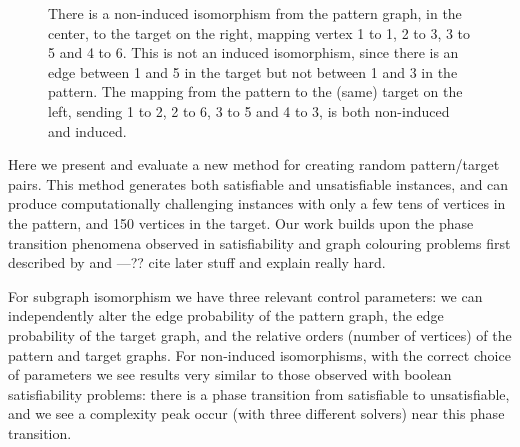 \documentclass[letterpaper]{article}
\begin{document}
\begin{figure}[b]

    \caption{There is a non-induced isomorphism from the pattern graph, in the center, to the target
    on the right, mapping vertex 1 to 1, 2 to 3, 3 to 5 and 4 to 6. This is not an induced
    isomorphism, since there is an edge between 1 and 5 in the target but not between 1 and 3 in the
    pattern. The mapping from the pattern to the (same) target on the left, sending 1 to 2, 2 to 6, 3 to
    5 and 4 to 3, is both non-induced and induced.}
    \label{figure:sip}
\end{figure}

Here we present and evaluate a new method for creating random pattern/target pairs. This method
generates both satisfiable and unsatisfiable instances, and can produce computationally challenging
instances with only a few tens of vertices in the pattern, and 150 vertices in the target. Our work
builds upon the phase transition phenomena observed in satisfiability and graph colouring problems
first described by \citet{Cheeseman:1991} and \citet{Mitchell:1992}---?? cite later stuff and
explain really hard.

For subgraph isomorphism we have three relevant control parameters: we can independently alter the
edge probability of the pattern graph, the edge probability of the target graph, and the relative
orders (number of vertices) of the pattern and target graphs.  For non-induced isomorphisms, with
the correct choice of parameters we see results very similar to those observed with boolean
satisfiability problems: there is a phase transition from satisfiable to unsatisfiable, and we see a
complexity peak occur (with three different solvers) near this phase transition.
\end{document}
